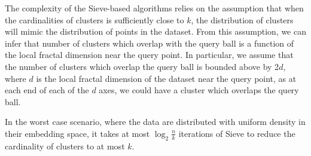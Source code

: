 The complexity of the Sieve-based algorithms relies on the assumption that when the cardinalities of clusters is sufficiently close to $k$, the distribution of clusters will mimic the distribution of points in the dataset. 
From this assumption, we can infer that number of clusters which overlap with the query ball is a function of the local fractal dimension near the query point.
In particular, we assume that the number of clusters which overlap the query ball is bounded above by 2$d$, where $d$ is the local fractal dimension of the dataset near the query point, as at each end of each of the $d$ axes, we could have a cluster which overlaps the query ball.

In the worst case scenario, where the data are distributed with uniform density in their embedding space, it takes at most $\log_2{\frac{n}{k}}$ iterations of Sieve to reduce the cardinality of clusters to at most $k$. 


